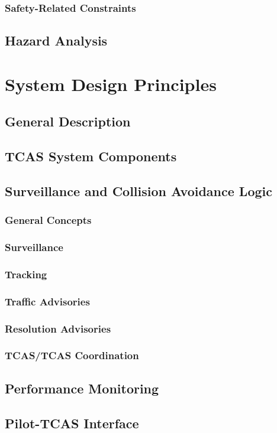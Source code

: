 \documentclass[12pt]{report}
\begin{document}
\subsection{Safety-Related Constraints}
\section{Hazard Analysis}

\chapter{System Design Principles}
\section{General Description}
\section{TCAS System Components}
\section{Surveillance and Collision Avoidance Logic}
\subsection{General Concepts}
\subsection{Surveillance}
\subsection{Tracking}
\subsection{Traffic Advisories}
\subsection{Resolution Advisories}
\subsection{TCAS/TCAS Coordination}
\section{Performance Monitoring}
\section{Pilot-TCAS Interface}
\end{document}
